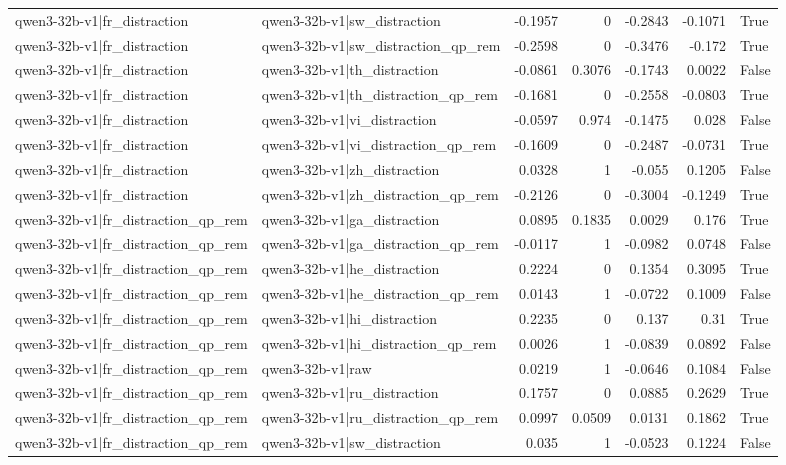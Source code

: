 \begin{table}
\begin{tabular}{l l r r r r l}
qwen3-32b-v1|fr_distraction & qwen3-32b-v1|sw_distraction & -0.1957 & 0 & -0.2843 & -0.1071 & True \\
qwen3-32b-v1|fr_distraction & qwen3-32b-v1|sw_distraction_qp_rem & -0.2598 & 0 & -0.3476 & -0.172 & True \\
qwen3-32b-v1|fr_distraction & qwen3-32b-v1|th_distraction & -0.0861 & 0.3076 & -0.1743 & 0.0022 & False \\
qwen3-32b-v1|fr_distraction & qwen3-32b-v1|th_distraction_qp_rem & -0.1681 & 0 & -0.2558 & -0.0803 & True \\
qwen3-32b-v1|fr_distraction & qwen3-32b-v1|vi_distraction & -0.0597 & 0.974 & -0.1475 & 0.028 & False \\
qwen3-32b-v1|fr_distraction & qwen3-32b-v1|vi_distraction_qp_rem & -0.1609 & 0 & -0.2487 & -0.0731 & True \\
qwen3-32b-v1|fr_distraction & qwen3-32b-v1|zh_distraction & 0.0328 & 1 & -0.055 & 0.1205 & False \\
qwen3-32b-v1|fr_distraction & qwen3-32b-v1|zh_distraction_qp_rem & -0.2126 & 0 & -0.3004 & -0.1249 & True \\
qwen3-32b-v1|fr_distraction_qp_rem & qwen3-32b-v1|ga_distraction & 0.0895 & 0.1835 & 0.0029 & 0.176 & True \\
qwen3-32b-v1|fr_distraction_qp_rem & qwen3-32b-v1|ga_distraction_qp_rem & -0.0117 & 1 & -0.0982 & 0.0748 & False \\
qwen3-32b-v1|fr_distraction_qp_rem & qwen3-32b-v1|he_distraction & 0.2224 & 0 & 0.1354 & 0.3095 & True \\
qwen3-32b-v1|fr_distraction_qp_rem & qwen3-32b-v1|he_distraction_qp_rem & 0.0143 & 1 & -0.0722 & 0.1009 & False \\
qwen3-32b-v1|fr_distraction_qp_rem & qwen3-32b-v1|hi_distraction & 0.2235 & 0 & 0.137 & 0.31 & True \\
qwen3-32b-v1|fr_distraction_qp_rem & qwen3-32b-v1|hi_distraction_qp_rem & 0.0026 & 1 & -0.0839 & 0.0892 & False \\
qwen3-32b-v1|fr_distraction_qp_rem & qwen3-32b-v1|raw & 0.0219 & 1 & -0.0646 & 0.1084 & False \\
qwen3-32b-v1|fr_distraction_qp_rem & qwen3-32b-v1|ru_distraction & 0.1757 & 0 & 0.0885 & 0.2629 & True \\
qwen3-32b-v1|fr_distraction_qp_rem & qwen3-32b-v1|ru_distraction_qp_rem & 0.0997 & 0.0509 & 0.0131 & 0.1862 & True \\
qwen3-32b-v1|fr_distraction_qp_rem & qwen3-32b-v1|sw_distraction & 0.035 & 1 & -0.0523 & 0.1224 & False \\

\end{tabular}
\end{table}
